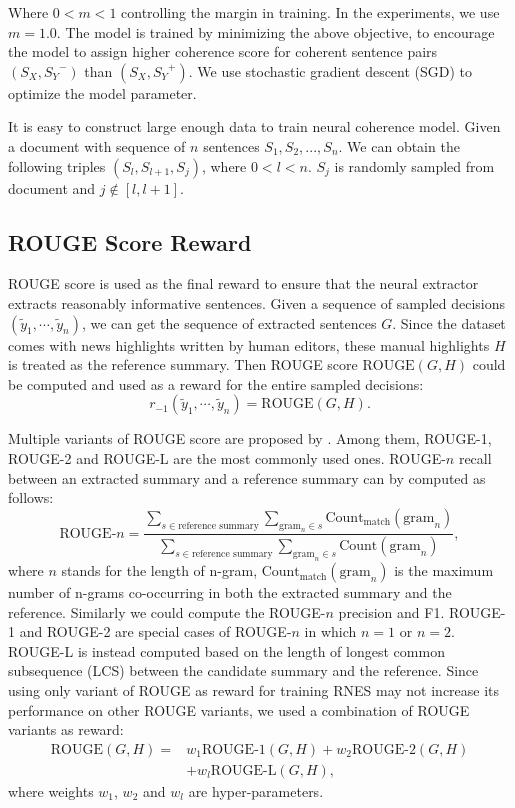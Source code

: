 \documentclass[letterpaper]{article} %
\begin{document}
	\noindent Where $0< m <1$ controlling the margin in training. In the experiments, we use $m = 1.0$. The model is trained by minimizing the above objective, to encourage the model to assign higher coherence score for coherent sentence pairs $(S_X, {S_Y}^-)$ than $({S_X}, {S_Y}^+)$. We use stochastic gradient descent (SGD) to optimize the model parameter.
	
	It is easy to construct large enough data to train neural coherence model. Given a document with sequence of $n$ sentences $S_1, S_2,...,S_n$. We can obtain the following triples $(S_l, S_{l+1}, S_j)$, where $0<l<n$. $S_j$ is randomly sampled from document and $j\notin[l,l+1]$.

	
	\subsection{ROUGE Score Reward}
	\label{rsr}
	ROUGE score is used as the final reward to ensure that the neural extractor extracts reasonably informative sentences. Given a sequence of sampled decisions $(\tilde{y}_1, \cdots, \tilde{y}_n)$, we can get the sequence of extracted sentences $G$. Since the dataset comes with news highlights written by human editors, these manual highlights $H$ is treated as the reference summary. Then ROUGE score $\text{ROUGE}(G, H)$ could be computed and used as a reward for the entire sampled decisions:
	\[ r_{-1}(\tilde{y}_1, \cdots, \tilde{y}_n) = \text{ROUGE}(G, H). \]

	Multiple variants of ROUGE score are proposed by \cite{rouge}. Among them, ROUGE-1, ROUGE-2 and ROUGE-L are the most commonly used ones. ROUGE-$n$ recall between an extracted summary and a reference summary can by computed as follows:
	\[ \text{ROUGE-}n = \frac{\sum_{s\in\text{reference summary}} \sum_{\text{gram}_n \in s} \text{Count}_{\text{match}} (\text{gram}_n) }{\sum_{s\in\text{reference summary}} \sum_{\text{gram}_n \in s} \text{Count} (\text{gram}_n)} , \]
	where $n$ stands for the length of n-gram, $\text{Count}_{\text{match}} (\text{gram}_n)$ is the maximum number of n-grams co-occurring in both the extracted summary and the reference. Similarly we could compute the ROUGE-$n$ precision and F1. ROUGE-1 and ROUGE-2 are special cases of ROUGE-$n$ in which $n=1$ or $n=2$. ROUGE-L is instead computed based on the length of longest common subsequence (LCS) between the candidate summary and the reference. Since using only variant of ROUGE as reward for training RNES may not increase its performance on other ROUGE variants, we used a combination of ROUGE variants as reward:
	\begin{align*}
	\text{ROUGE}(G, H) = & w_1 \text{ROUGE-1}(G, H) + w_2 \text{ROUGE-2}(G, H) \\
	& + w_l \text{ROUGE-L}(G, H),
	\end{align*}
	where weights $w_1$, $w_2$ and $w_l$ are hyper-parameters.
\end{document}
